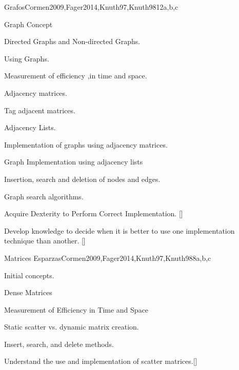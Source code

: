 \begin{syllabus}
\begin{unit}{Grafos}{}{Cormen2009,Fager2014,Knuth97,Knuth98}{12}{a,b,c}
   \begin{topics}
    \item Graph Concept
    \item Directed Graphs and  Non-directed Graphs.
    \item Using Graphs.
    \item Measurement of efficiency ,in time and space.
    \item Adjacency matrices.
    \item Tag adjacent matrices.
    \item Adjacency Lists.
    \item Implementation of graphs using adjacency matrices.
    \item Graph Implementation using adjacency lists
    \item Insertion, search and deletion of nodes and edges.
    \item Graph search algorithms.
   \end{topics}
   \begin{learningoutcomes}
      \item  Acquire Dexterity to Perform Correct Implementation. [\Usage]
      \item  Develop knowledge to decide when it is better to use one implementation technique than another. [\Usage]   
   \end{learningoutcomes}
\end{unit}

\begin{unit}{Matrices Esparzas}{}{Cormen2009,Fager2014,Knuth97,Knuth98}{8}{a,b,c}
   \begin{topics}
    \item  Initial concepts.
    \item  Dense Matrices
    \item  Measurement of Efficiency in Time and Space
    \item  Static scatter vs. dynamic matrix creation.
    \item  Insert, search, and delete methods.
   \end{topics}

\begin{learningoutcomes}
      \item Understand the use and implementation of scatter matrices.[\Assessment]
   \end{learningoutcomes}
\end{unit}


\end{syllabus}

